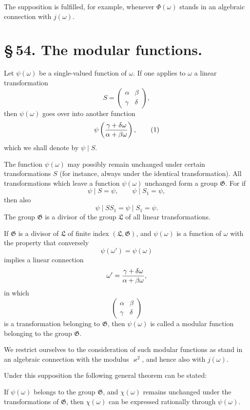 \documentclass[11pt]{article}
\begin{document}
The supposition is fulfilled, for example, whenever $\Phi(\omega)$ stands in an algebraic connection with $j(\omega)$.

\section*{\S\,54. The modular functions.}

Let $\psi(\omega)$ be a single-valued function of $\omega$. If one applies to $\omega$ a linear transformation
\[
S=\begin{pmatrix}\alpha&\beta\\ \gamma&\delta\end{pmatrix},
\]
then $\psi(\omega)$ goes over into another function
\begin{equation}
\psi\left({\gamma+\delta\omega\over\alpha+\beta\omega}\right),
\tag{1}
\end{equation}
which we shall denote by $\psi\mid S$.

The function $\psi(\omega)$ may possibly remain unchanged under certain transformations $S$ (for instance, always under the identical transformation). All transformations which leave a function $\psi(\omega)$ unchanged form a group $\mathfrak G$. For if
\[
\psi\mid S=\psi,
\qquad
\psi\mid S_1=\psi,
\]
then also
\[
\psi\mid SS_1=\psi\mid S_1=\psi.
\]
The group $\mathfrak G$ is a divisor of the group $\mathfrak L$ of all linear transformations.

If $\mathfrak G$ is a divisor of $\mathfrak L$ of finite index $(\mathfrak L,\mathfrak G)$, and $\psi(\omega)$ is a function of $\omega$ with the property that conversely
\[
\psi(\omega')=\psi(\omega)
\]
implies a linear connection
\[
\omega'={\gamma+\delta\omega\over\alpha+\beta\omega},
\]
in which
\[
\begin{pmatrix}\alpha&\beta\\ \gamma&\delta\end{pmatrix}
\]
is a transformation belonging to $\mathfrak G$, then $\psi(\omega)$ is called a modular function belonging to the group $\mathfrak G$.

We restrict ourselves to the consideration of such modular functions as stand in an algebraic connection with the modulus $\varkappa^2$, and hence also with $j(\omega)$.

Under this supposition the following general theorem can be stated:

If $\psi(\omega)$ belongs to the group $\mathfrak G$, and $\chi(\omega)$ remains unchanged under the transformations of $\mathfrak G$, then $\chi(\omega)$ can be expressed rationally through $\psi(\omega)$.
\end{document}

